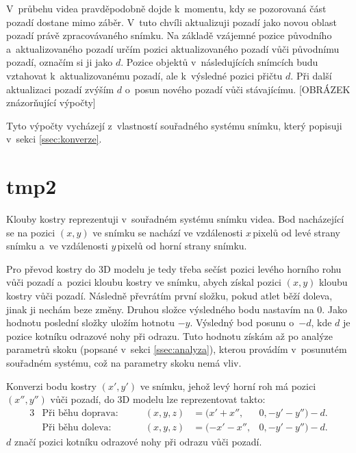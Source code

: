 V~průbehu videa pravděpodobně dojde k~momentu, kdy se pozorovaná část pozadí dostane mimo záběr. V~tuto chvíli aktualizuji pozadí jako novou oblast pozadí právě zpracovávaného snímku. Na základě vzájemné pozice původního a~aktualizovaného pozadí určím pozici aktualizovaného pozadí vůči původnímu pozadí, označím si ji jako $d$. Pozice objektů v~následujících snímcích budu vztahovat k~aktualizovanému pozadí, ale k~výsledné pozici přičtu $d$. Při další aktualizaci pozadí zvýším $d$ o~posun nového pozadí vůči stávajícímu. [OBRÁZEK znázorňující výpočty]

Tyto výpočty vycházejí z~vlastností souřadného systému snímku, který popisuji v~sekci \ref{ssec:konverze}.

\section{tmp2}

Klouby kostry reprezentuji v~souřadném systému snímku videa. Bod nacházející se na pozici $(x,y)$ ve snímku se nachází ve vzdálenosti $x$\,\rm pixelů od levé strany snímku a~ve vzdálenosti $y$\,\rm pixelů od horní strany snímku.

Pro převod kostry do 3D modelu je tedy třeba sečíst pozici levého horního rohu vůči pozadí a~pozici kloubu kostry ve snímku, abych získal pozici $(x,y)$ kloubu kostry vůči pozadí. Následně převrátím první složku, pokud atlet běží doleva, jinak ji nechám beze změny. Druhou složce výsledného bodu nastavím na $0$. Jako hodnotu poslední složky uložím hotnotu $-y$. Výsledný bod posunu o~$-d$, kde $d$ je pozice kotníku odrazové nohy při odrazu. Tuto hodnotu získám až po analýze parametrů skoku (popsané v~sekci \ref{ssec:analyza}), kterou provádím v~posunutém souřadném systému, což na parametry skoku nemá vliv.

Konverzi bodu kostry $(x',y')$ ve snímku, jehož levý horní roh má pozici $(x'',y'')$ vůči pozadí, do 3D modelu lze reprezentovat takto:
\begin{alignat*}{3}
&\text{Při běhu doprava:} &\qquad (x,y,z)&=(x'+x'',&0,-y'-y'')-d. \\
&\text{Při běhu doleva:} &\qquad (x,y,z)&=(-x'-x'',&0,-y'-y'')-d.
\end{alignat*}
$d$ značí pozici kotníku odrazové nohy při odrazu vůči pozadí.











